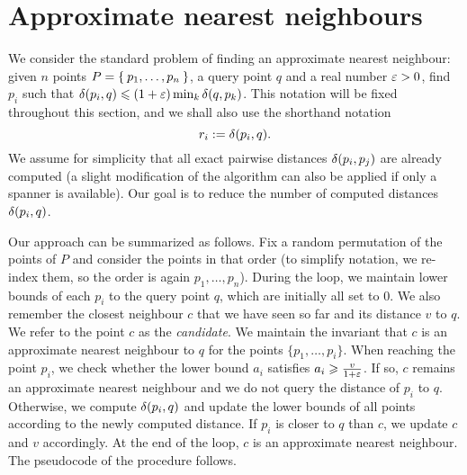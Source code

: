 \section{Approximate nearest neighbours}
\label{sec:ann}
We consider the standard problem of finding an approximate nearest neighbour: given
$n$ points $P = \Set{p_1, \dots, p_n}$, a query point $q$ and a real number $\varepsilon > 0$,
find $p_i$ such that $\delta(p_i, q) \leqslant (1 + \varepsilon) \min_{k} \delta(q, p_k)$. This notation will be fixed throughout this 
section, and we shall also use the shorthand notation
\[
    r_i := \delta(p_i, q).
\]
We assume for simplicity
that all exact pairwise distances $\delta(p_i, p_j)$ are already computed
(a slight modification of the algorithm can also be applied if only a spanner is available).
Our goal is to reduce the number of computed distances $\delta(p_i, q)$. 

Our approach can be summarized as follows. 
Fix a random permutation of the points of $P$ 
and consider the points in that order 
(to simplify notation,
we re-index them, so the order is again $p_1, \dots, p_n$).
During the loop, we maintain lower bounds of each $p_i$
to the query point $q$, which are initially all set to $0$.
We also remember the closest neighbour $c$ that we have seen so
far and its distance $v$ to $q$.
We refer to the point $c$ as the \emph{candidate}.
We maintain the invariant that $c$ is an approximate nearest neighbour
to $q$ for the points $\{p_1,\ldots,p_i\}$.
When reaching the point $p_i$, we check whether the lower
bound $a_i$ satisfies $a_i\geqslant \frac{v}{1+\varepsilon}$.
If so, $c$ remains an approximate nearest neighbour and
we do not query the distance of $p_i$ to $q$.
Otherwise, we compute $\delta(p_i,q)$ and update the lower bounds
of all points according to the newly computed distance.
If $p_i$ is closer to $q$ than $c$, we update $c$ and $v$
accordingly. At the end of the loop, $c$ is an approximate nearest
neighbour. The pseudocode of the procedure follows.


\begin{algorithmic}
\label{alg:ann_blind}

    \State {}
        \Else
            \State {}
            \EndIf
        \EndIf
    \EndFor
    \State {}
\EndFunction
\end{algorithmic}

